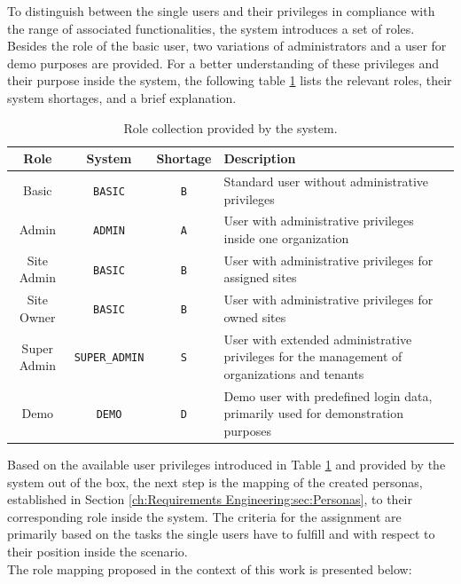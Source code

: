 To distinguish between the single users and their privileges in compliance with the range of associated functionalities, the system introduces a set of roles. Besides the role of the basic user, two variations of administrators and a user for demo purposes are provided.
For a better understanding of these privileges and their purpose inside the system, the following table \ref{tab:system-role-collection} lists the relevant roles, their system shortages, and a brief explanation.

\begingroup
\setlength{\tabcolsep}{10pt} %
\renewcommand{\arraystretch}{1.5} %
\begin{table}[h]
    \centering
    \caption{Role collection provided by the system.}
    \begin{tabular}{c|c|c|m{6cm}}
        Role & System & Shortage & Description \\
        \hline
        Basic & \verb|BASIC| & \verb|B| & Standard user without administrative privileges \\
        Admin & \verb|ADMIN| & \verb|A| & User with administrative privileges inside one organization \\
        Site Admin & \verb|BASIC| & \verb|B| & User with administrative privileges for assigned sites \\
        Site Owner & \verb|BASIC| & \verb|B| & User with administrative privileges for owned sites \\
        Super Admin & \verb|SUPER_ADMIN| & \verb|S| & User with extended administrative privileges for the management of organizations and tenants \\
        Demo & \verb|DEMO| & \verb|D| & Demo user with predefined login data, primarily used for demonstration purposes
    \end{tabular}
    \label{tab:system-role-collection}
\end{table}
\endgroup

\noindent Based on the available user privileges introduced in Table \ref{tab:system-role-collection} and provided by the system out of the box, the next step is the mapping of the created personas, established in Section \ref{ch:Requirements Engineering:sec:Personas}, to their corresponding role inside the system.
The criteria for the assignment are primarily based on the tasks the single users have to fulfill and with respect to their position inside the scenario. \\
\noindent The role mapping proposed in the context of this work is presented below:

